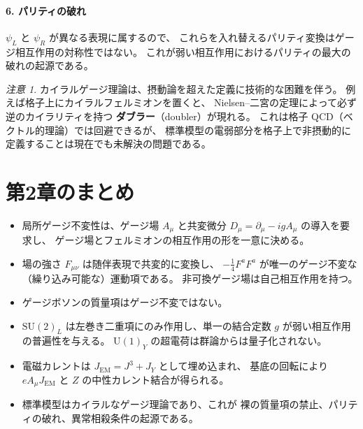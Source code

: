 \documentclass[uplatex,dvipdfmx,a4paper,11pt,openany]{jsbook}
\newcommand{\term}[2]{\textbf{#1}（#2）}
\numberwithin{equation}{chapter}
\theoremstyle{definition}
\theoremstyle{plain}
\theoremstyle{remark}
\newtheorem{remark}{注意}[chapter]
\newcommand{\SU}{\mathrm{SU}}
\newcommand{\U}{\mathrm{U}}
\begin{document}
\paragraph{6. パリティの破れ}
$\psi_L$ と $\psi_R$ が異なる表現に属するので、
これらを入れ替えるパリティ変換はゲージ相互作用の対称性ではない。
これが弱い相互作用におけるパリティの最大の破れの起源である。
\begin{remark}
カイラルゲージ理論は、摂動論を超えた定義に技術的な困難を伴う。
例えば格子上にカイラルフェルミオンを置くと、
Nielsen--二宮の定理によって必ず逆のカイラリティを持つ
\term{ダブラー}{doubler}が現れる。
これは格子 QCD（ベクトル的理論）では回避できるが、
標準模型の電弱部分を格子上で非摂動的に定義することは現在でも未解決の問題である。
\end{remark}
\section*{第2章のまとめ}
\begin{itemize}
    \item 局所ゲージ不変性は、ゲージ場 $A_\mu$ と共変微分 $D_\mu=\partial_\mu-igA_\mu$ の導入を要求し、
    ゲージ場とフェルミオンの相互作用の形を一意に決める。
    \item 場の強さ $F_{\mu\nu}$ は随伴表現で共変的に変換し、
    $-\frac14F^aF^a$ が唯一のゲージ不変な（繰り込み可能な）運動項である。
    非可換ゲージ場は自己相互作用を持つ。
    \item ゲージボソンの質量項はゲージ不変ではない。
    \item $\SU(2)_L$ は左巻き二重項にのみ作用し、単一の結合定数 $g$ が弱い相互作用の普遍性を与える。
    $\U(1)_Y$ の超電荷は群論からは量子化されない。
    \item 電磁カレントは $J_{\mathrm{EM}}=J^3+J_Y$ として埋め込まれ、
    基底の回転により $eA_\mu J_{\mathrm{EM}}$ と $Z$ の中性カレント結合が得られる。
    \item 標準模型はカイラルなゲージ理論であり、これが
    裸の質量項の禁止、パリティの破れ、異常相殺条件の起源である。
\end{itemize}
\end{document}
